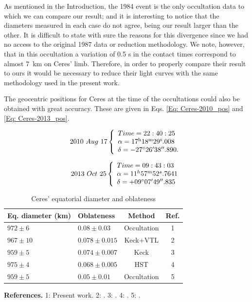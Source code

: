 \documentclass[useAMS,usenatbib]{mn2e}
\begin{document}
As mentioned in the Introduction, the 1984 event \citep{Millis1987} is the only occultation data to which we can compare our result; and it is interesting to notice that the diameters measured in each case do not agree, being our result larger than the other. It is difficult to state with sure the reasons for this divergence since we had no access to the original 1987 data or reduction methodology. We note, however, that in this occultation a variation of 0.5 s in the contact times correspond to almost 7~km on Ceres' limb. Therefore, in order to properly compare their result to ours it would be necessary to reduce their light curves with the same methodology used in the present work.

The geocentric positions for Ceres at the time of the occultations could also be obtained with great accuracy. These are given in Eqs. \ref{Eq: Ceres-2010_pos} and \ref{Eq: Ceres-2013_pos}.

\begin{equation}
2010 ~ Aug ~ 17
\left\{ 
  \begin{array}{l l}
    Time = 22:40:25\\
    \alpha = 17^{\text{h}}18^{\text{m}}29^{\text{s}}.008\\
    \delta = -27\hbox{$^\circ$} 26\hbox{$^\prime$} 38\hbox{$^{\prime\prime}$}.890.
  \end{array}
\right.
\label{Eq: Ceres-2010_pos}
\end{equation}

\begin{equation}
2013 ~ Oct ~ 25
\left\{ 
  \begin{array}{l l}
    Time = 09:43:03\\
    \alpha = 11^{h}57^{m}52^{s}.7641\\
    \delta = +09\hbox{$^\circ$} 07\hbox{$^\prime$} 49\hbox{$^{\prime\prime}$}.835
  \end{array}
\right.
\label{Eq: Ceres-2013_pos}
\end{equation}



\begin{table}
  \caption{Ceres' equatorial diameter and oblateness \label{Tab: Ceres-final}}
  \begin{centering}
  \begin{tabular}{@{}llcc}
  \hline
     Eq. diameter (km) & Oblateness & Method & Ref. \\
\hline
$972 \pm 6$  & $0.08  \pm 0.03$  & Occultation & 1\\
$967 \pm 10$ & $0.078 \pm 0.015$ & Keck+VTL    & 2 \\
$959 \pm 5$  & $0.074 \pm 0.007$ & Keck        & 3\\
$975 \pm 4$  & $0.068 \pm 0.005$ & HST         & 4\\
$959 \pm 5$  & $0.05  \pm 0.01$  & Occultation & 5\\
\hline
\end{tabular}
\par\end{centering}
\textbf{References.} 1: Present work. 2: \cite{Drummond2014}. 3: \cite{Carry2008}. 4: \cite{Thomas2005}. 5: \cite{Millis1987}.
\end{table}
\end{document}
